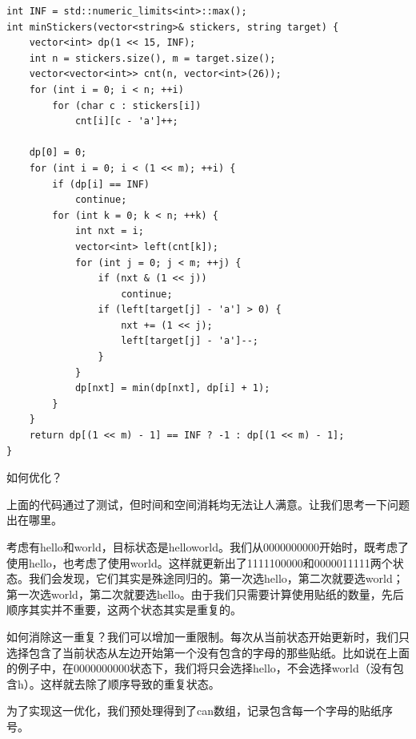 \documentclass[9pt, b5paaper]{book}
\begin{document}
\begin{verbatim}
int INF = std::numeric_limits<int>::max();
int minStickers(vector<string>& stickers, string target) {
    vector<int> dp(1 << 15, INF);
    int n = stickers.size(), m = target.size();
    vector<vector<int>> cnt(n, vector<int>(26));
    for (int i = 0; i < n; ++i)
        for (char c : stickers[i])
            cnt[i][c - 'a']++;

    dp[0] = 0;
    for (int i = 0; i < (1 << m); ++i) {
        if (dp[i] == INF)
            continue;
        for (int k = 0; k < n; ++k) {
            int nxt = i;
            vector<int> left(cnt[k]);
            for (int j = 0; j < m; ++j) {
                if (nxt & (1 << j))
                    continue;
                if (left[target[j] - 'a'] > 0) {
                    nxt += (1 << j);
                    left[target[j] - 'a']--;
                }
            }
            dp[nxt] = min(dp[nxt], dp[i] + 1);
        }
    }
    return dp[(1 << m) - 1] == INF ? -1 : dp[(1 << m) - 1];
}
\end{verbatim}

如何优化？

上面的代码通过了测试，但时间和空间消耗均无法让人满意。让我们思考一下问题出在哪里。

考虑有hello和world，目标状态是helloworld。我们从0000000000开始时，既考虑了使用hello，也考虑了使用world。这样就更新出了1111100000和0000011111两个状态。我们会发现，它们其实是殊途同归的。第一次选hello，第二次就要选world；第一次选world，第二次就要选hello。由于我们只需要计算使用贴纸的数量，先后顺序其实并不重要，这两个状态其实是重复的。

如何消除这一重复？我们可以增加一重限制。每次从当前状态开始更新时，我们只选择包含了当前状态从左边开始第一个没有包含的字母的那些贴纸。比如说在上面的例子中，在0000000000状态下，我们将只会选择hello，不会选择world（没有包含h）。这样就去除了顺序导致的重复状态。

为了实现这一优化，我们预处理得到了can数组，记录包含每一个字母的贴纸序号。
\end{document}
